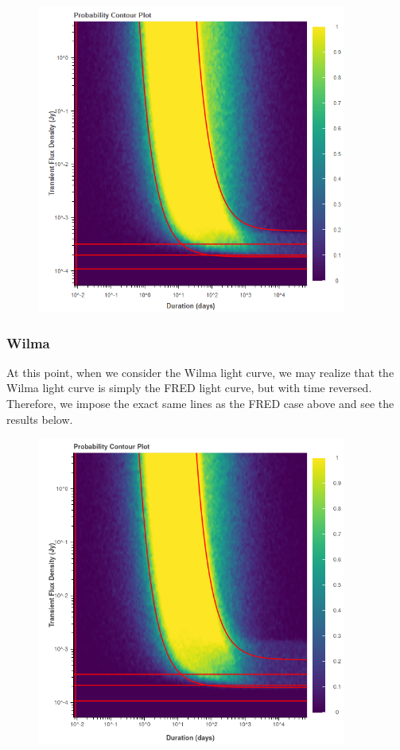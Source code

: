 \documentclass{article}
\begin{document}
\begin{figure}[H] 
	\begin{center}
		\includegraphics[width=4in]{output_fred_ProbContour.png}
				
		\label{FRED}
	\end{center}
\end{figure}
\subsubsection{Wilma}
At this point, when we consider the Wilma light curve, we may realize that the Wilma light curve is simply the FRED light curve, but with time reversed. Therefore, we impose the exact same lines as the FRED case above and see the results below.
\begin{figure}[H] 
	\begin{center}
		\includegraphics[width=4in]{output_wilma_ProbContour.png}
		
		\label{tophat}
	\end{center}
\end{figure}
\end{document}
